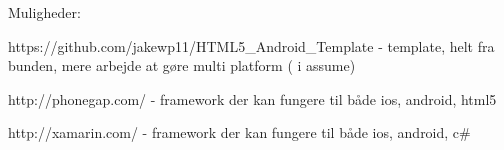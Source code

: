 Muligheder:

https://github.com/jakewp11/HTML5\_Android\_Template - template, helt fra bunden, mere arbejde at gøre multi platform ( i assume)

http://phonegap.com/ - framework der kan fungere til både ios, android, html5

http://xamarin.com/ - framework der kan fungere til både ios, android, c#